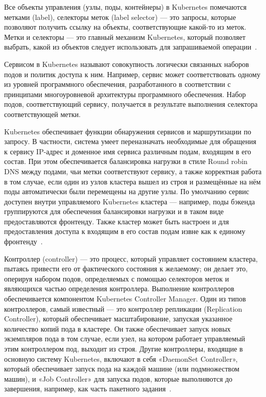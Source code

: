 Все объекты управления (узлы, поды, контейнеры) в Kubernetes помечаются метками (label), селекторы меток (label selector) --- это запросы, которые позволяют получить ссылку на объекты, соответствующие какой-то из меток. Метки и селекторы — это главный механизм Kubernetes, который позволяет выбрать, какой из объектов следует использовать для запрашиваемой операции~\cite{kubernetes}.

Сервисом в Kubernetes называют совокупность логически связанных наборов подов и политик доступа к ним. Например, сервис может соответствовать одному из уровней программного обеспечения, разработанного в соответствии с принципами многоуровневой архитектуры программного обеспечения. Набор подов, соответствующий сервису, получается в результате выполнения селектора соответствующей метки.

Kubernetes обеспечивает функции обнаружения сервисов и маршрутизации по запросу. В частности, система умеет переназначать необходимые для обращения к сервису IP-адрес и доменное имя сервиса различным подам, входящим в его состав. При этом обеспечивается балансировка нагрузки в стиле Round robin DNS между подами, чьи метки соответствуют сервису, а также корректная работа в том случае, если один из узлов кластера вышел из строя и размещённые на нём поды автоматически были перемещены на другие узлы. По умолчанию сервис доступен внутри управляемого Kubernetes кластера --- например, поды бэкенда группируются для обеспечения балансировки нагрузки и в таком виде предоставляются фронтенду. Также кластер может быть настроен и для предоставления доступа к входящим в его состав подам извне как к единому фронтенду~\cite{kubernetes}.

Контроллер (controller) --- это процесс, который управляет состоянием кластера, пытаясь привести его от фактического состояния к желаемому; он делает это, оперируя набором подов, определяемых с помощью селекторов меток и являющихся частью определения контроллера. Выполнение контроллеров обеспечивается компонентом Kubernetes Controller Manager. Один из типов контроллеров, самый известный — это контроллер репликации (Replication Controller), который обеспечивает масштабирование, запуская указанное количество копий пода в кластере. Он также обеспечивает запуск новых экземпляров пода в том случае, если узел, на котором работает управляемый этим контроллером под, выходит из строя. Другие контроллеры, входящие в основную систему Kubernetes, включают в себя «DaemonSet Controller», который обеспечивает запуск пода на каждой машине (или подмножеством машин), и «Job Controller» для запуска подов, которые выполняются до завершения, например, как часть пакетного задания~\cite{kubernetes}.

